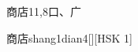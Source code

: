 \begin{entry}{商店}{11,8}{⼝、⼴}
  \begin{phonetics}{商店}{shang1dian4}[][HSK 1]
  \end{phonetics}
\end{entry}
